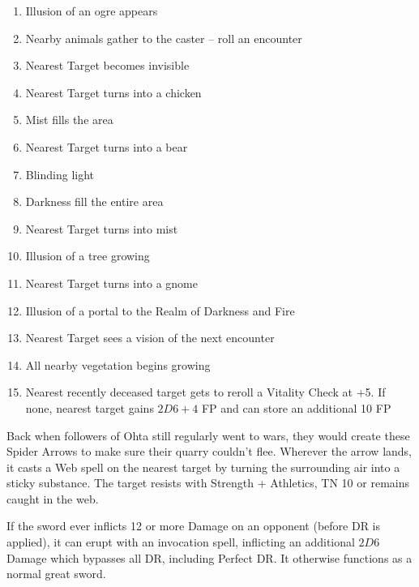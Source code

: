 \begin{multicols}{2}
\begin{tcolorbox}
	\begin{enumerate}
		\item{Illusion of an ogre appears}
		\item{Nearby animals gather to the caster -- roll an encounter}
		\item{Nearest Target becomes invisible}
		\item{Nearest Target turns into a chicken}
		\item{Mist fills the area}
		\item{Nearest Target turns into a bear}
		\item{Blinding light}
		\item{Darkness fill the entire area}
		\item{Nearest Target turns into mist}
		\item{Illusion of a tree growing}
		\item{Nearest Target turns into a gnome}
		\item{Illusion of a portal to the Realm of Darkness and Fire}
		\item{Nearest Target sees a vision of the next encounter}
		\item{All nearby vegetation begins growing}
		\item{Nearest recently deceased target gets to reroll a Vitality Check at +5.  If none, nearest target gains $2D6+4$ FP and can store an additional 10 FP}
	\end{enumerate}
\end{tcolorbox}

\label{spiderarrows}

Back when followers of Ohta still regularly went to wars, they would create these Spider Arrows to make sure their quarry couldn't flee.
Wherever the arrow lands, it casts a Web spell on the nearest target by turning the surrounding air into a sticky substance.
The target resists with Strength + Athletics, TN 10 or remains caught in the web.

\label{godslayer}

If the sword ever inflicts 12 or more Damage on an opponent (before DR is applied), it can erupt with an invocation spell, inflicting an additional $2D6$ Damage which bypasses all DR, including Perfect DR.
It otherwise functions as a normal great sword.


\end{multicols}
